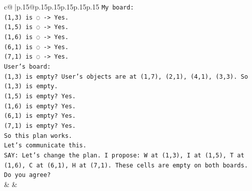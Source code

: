 \documentclass{article}
\begin{document}
{\begin{supertabular}{c@{$\;$}|p{.15\linewidth}@{}p{.15\linewidth}p{.15\linewidth}p{.15\linewidth}p{.15\linewidth}p{.15\linewidth}}
{{{\texttt{My board:} \\
\texttt{(1,3) is ◌ {-}> Yes.} \\
\texttt{(1,5) is ◌ {-}> Yes.} \\
\texttt{(1,6) is ◌ {-}> Yes.} \\
\texttt{(6,1) is ◌ {-}> Yes.} \\
\texttt{(7,1) is ◌ {-}> Yes.} \\
\texttt{User's board:} \\
\texttt{(1,3) is empty? User's objects are at (1,7), (2,1), (4,1), (3,3). So (1,3) is empty.} \\
\texttt{(1,5) is empty? Yes.} \\
\texttt{(1,6) is empty? Yes.} \\
\texttt{(6,1) is empty? Yes.} \\
\texttt{(7,1) is empty? Yes.} \\
\texttt{So this plan works.} \\
\texttt{Let's communicate this.} \\
\texttt{SAY: Let's change the plan. I propose: W at (1,3), I at (1,5), T at (1,6), C at (6,1), H at (7,1). These cells are empty on both boards. Do you agree?} \\
            }
        }
    }
    & & \\ \\


\end{supertabular}}
\end{document}
